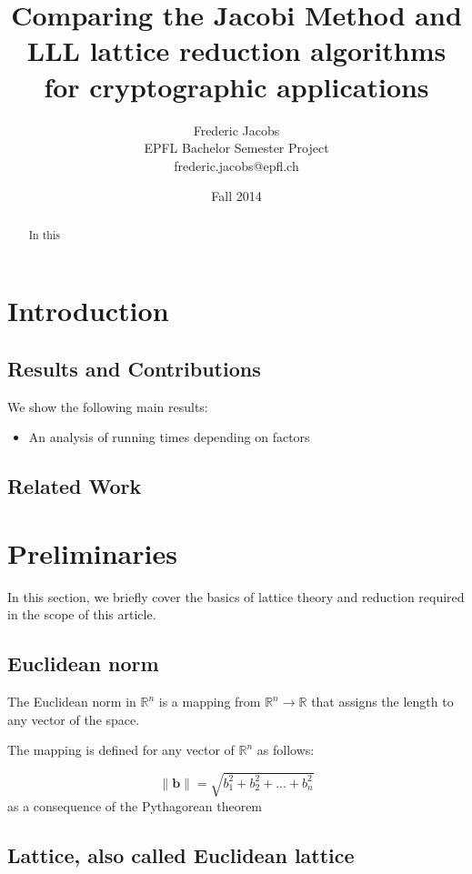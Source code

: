 \documentclass[10pt, a4paper]{article}
\title{Comparing the Jacobi Method and LLL lattice reduction algorithms for cryptographic applications}
\date{Fall 2014}
\author{Frederic Jacobs\\ EPFL Bachelor Semester Project\\ frederic.jacobs@epfl.ch}
\begin{document}
\maketitle

\begin{abstract}
In this \cite{originalJacobiMethodLatticeBasisReduction}
\end{abstract}

\section{Introduction}
\subsection{Results and Contributions}

We show the following main results:
\begin{itemize}
\item An analysis of running times depending on factors
\end{itemize}

\subsection{Related Work}

\section{Preliminaries}

In this section, we briefly cover the basics of lattice theory and reduction required in the scope of this article.

\subsection{Euclidean norm}

The Euclidean norm in $\mathbb{R}^n$ is a mapping from $\mathbb{R}^n \to \mathbb{R}$ that assigns the length to any vector of the space.

The mapping is defined for any vector of $\mathbb{R}^n$ as follows: 

\[
\|\mathbf{b}\| = \sqrt{b_1^2 + b_2^2 + ... + b_n^2} 
\] 
as a consequence of the Pythagorean theorem

\subsection{Lattice, also called Euclidean lattice}
\end{document}
